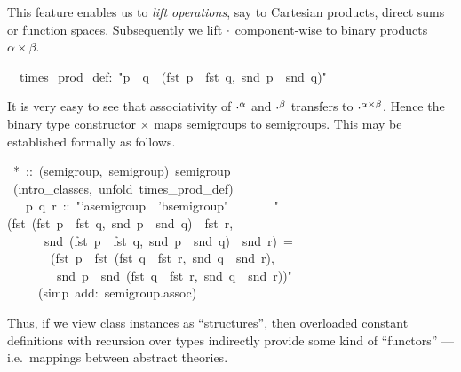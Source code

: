 \begin{isabelle}
\begin{isamarkuptext}
 This feature enables us to \emph{lift operations}, say to Cartesian
 products, direct sums or function spaces.  Subsequently we lift
 $\cdot$ component-wise to binary products $\alpha \times \beta$.%
\end{isamarkuptext}%
\isanewline
~~times\_prod\_def:~{"}p~{\isasymOtimes}~q~{\isasymequiv}~(fst~p~{\isasymOtimes}~fst~q,~snd~p~{\isasymOtimes}~snd~q){"}%
\begin{isamarkuptext}%
It is very easy to see that associativity of $\cdot^\alpha$ and
 $\cdot^\beta$ transfers to ${\cdot}^{\alpha \times \beta}$.  Hence
 the binary type constructor $\times$ maps semigroups to semigroups.
 This may be established formally as follows.%
\end{isamarkuptext}%
~*~::~(semigroup,~semigroup)~semigroup\isanewline
{}~(intro\_classes,~unfold~times\_prod\_def)\isanewline
~~~p~q~r~::~{"}'a{\isasymColon}semigroup~{\isasymtimes}~'b{\isasymColon}semigroup{"}\isanewline
~~\isanewline
~~~~{"}(fst~(fst~p~{\isasymOtimes}~fst~q,~snd~p~{\isasymOtimes}~snd~q)~{\isasymOtimes}~fst~r,\isanewline
~~~~~~snd~(fst~p~{\isasymOtimes}~fst~q,~snd~p~{\isasymOtimes}~snd~q)~{\isasymOtimes}~snd~r)~=\isanewline
~~~~~~~(fst~p~{\isasymOtimes}~fst~(fst~q~{\isasymOtimes}~fst~r,~snd~q~{\isasymOtimes}~snd~r),\isanewline
~~~~~~~~snd~p~{\isasymOtimes}~snd~(fst~q~{\isasymOtimes}~fst~r,~snd~q~{\isasymOtimes}~snd~r)){"}\isanewline
~~~~~(simp~add:~semigroup.assoc)\isanewline
{}%
\begin{isamarkuptext}%
Thus, if we view class instances as ``structures'', then overloaded
 constant definitions with recursion over types indirectly provide
 some kind of ``functors'' --- i.e.\ mappings between abstract
 theories.%
\end{isamarkuptext}%
\end{isabelle}%
